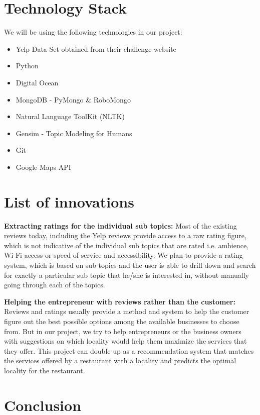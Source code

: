 \documentclass[12pt]{article} %
\begin{document}
\section{Technology Stack}

We will be using the following technologies in our project:
\begin{itemize}
\item Yelp Data Set obtained from their challenge website
\item Python
\item Digital Ocean
\item MongoDB - PyMongo \& RoboMongo
\item Natural Language ToolKit (NLTK)
\item Gensim - Topic Modeling for Humans
\item Git
\item Google Maps API
\end{itemize}

\section{List of innovations}

\textbf{Extracting ratings for the individual sub topics:} Most of the existing reviews today, including the Yelp reviews provide access to a raw rating figure, which is not indicative of the individual sub topics that are rated i.e. ambience, Wi Fi access or speed of service and accessibility. We plan to provide a rating system, which is based on sub topics and the user is able to drill down and search for exactly a particular sub topic that he/she is interested in, without manually going through each of the topics.

\textbf{Helping the entrepreneur with reviews rather than the customer:} Reviews and ratings usually provide a method and system to help the customer figure out the best possible options among the available businesses to choose from. But in our project, we try to help entrepreneurs or the business owners with suggestions on which locality would help them maximize the services that they offer. This project can double up as a recommendation system that matches the services offered by a restaurant with a locality and predicts the optimal locality for the restaurant.


\section{Conclusion}
\end{document}
